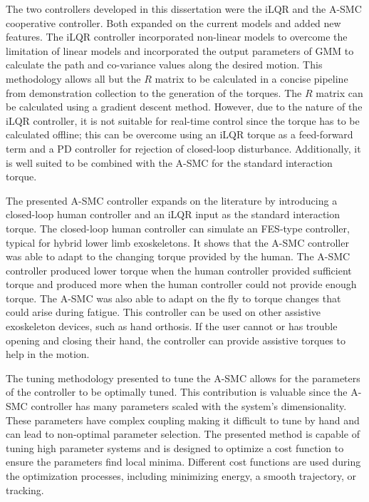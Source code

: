 The two controllers developed in this dissertation were the iLQR and the A-SMC cooperative controller. Both expanded on the current models and added new features. The iLQR controller incorporated non-linear models to overcome the limitation of linear models and incorporated the output parameters of GMM to calculate the path and co-variance values along the desired motion. This methodology allows all but the $R$ matrix to be calculated in a concise pipeline from demonstration collection to the generation of the torques. The $R$ matrix can be calculated using a gradient descent method. However, due to the nature of the iLQR controller, it is not suitable for real-time control since the torque has to be calculated offline; this can be overcome using an iLQR torque as a feed-forward term and a PD controller for rejection of closed-loop disturbance. Additionally, it is well suited to be combined with the A-SMC for the standard interaction torque. 

The presented A-SMC controller expands on the literature by introducing a closed-loop human controller and an iLQR input as the standard interaction torque. The closed-loop human controller can simulate an FES-type controller, typical for hybrid lower limb exoskeletons. It shows that the A-SMC controller was able to adapt to the changing torque provided by the human. The A-SMC controller produced lower torque when the human controller provided sufficient torque and produced more when the human controller could not provide enough torque. The A-SMC was also able to adapt on the fly to torque changes that could arise during fatigue. This controller can be used on other assistive exoskeleton devices, such as hand orthosis. If the user cannot or has trouble opening and closing their hand, the controller can provide assistive torques to help in the motion. 

The tuning methodology presented to tune the A-SMC allows for the 
parameters of the controller to be optimally tuned. This contribution is valuable since the A-SMC controller has many parameters scaled with the system's dimensionality. These parameters have complex coupling making it difficult to tune by hand and can lead to non-optimal parameter selection. The presented method is capable of tuning high parameter systems and is designed to optimize a cost function to ensure the parameters find local minima. Different cost functions are used during the optimization processes, including minimizing energy,  a smooth trajectory, or tracking.   



